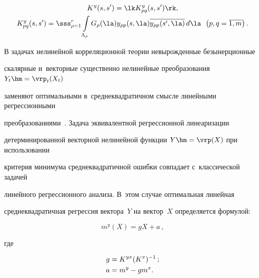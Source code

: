 


\noindent

\begin{multline*}

     K^y (s,s') =\lk K_{pq}^y (s,s')\rk,\\

     K_{pq}^y (s,s') = \displaystyle\sss_{\rho=1}^r \int\limits_{\Lambda_\rho} G_\rho (\la) 

y_{\rho p}(s,\la) \overline{y_{\rho p}(s',\la)}\,d\la\enskip \left(p,q=\overline{1,m}\right).


      \end{multline*}



В задачах нелинейной корреляционной теории невырожденные безынерционные 

скалярные и~векторные существенно нелинейные преобразования $Y_t \hm=\vrp_t(X_t)$ 

заменяют оптимальными в~среднеквадратичном смысле линейными регрессионными 

преобразованиями~\cite{12-sin}. Задача эквивалентной регрессионной линеаризации 

детерминированной векторной нелинейной функции $Y\hm=\vrp (X)$ при использовании 

критерия минимума среднеквадратичной ошибки совпадает с~классической задачей 

линейного регрессионного анализа. В~этом случае оптимальная линейная 

среднеквадратичная регрессия вектора~$Y$ на вектор~$X$ определяется формулой:

\begin{equation*}

m^y(X) =gX+a\,,


\end{equation*}

где



\vspace*{-3pt}



\noindent

\begin{align}

g&=K^{yx} (K^x)^{-1}\,;\label{e12a}\\

a&=m^y-gm^x.\notag

\end{align}

